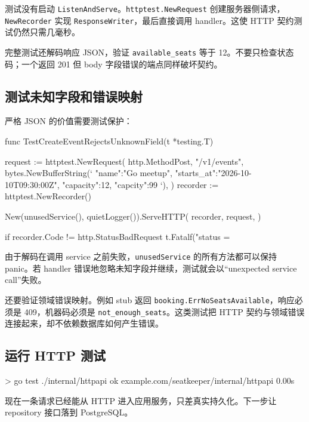 测试没有启动 \texttt{ListenAndServe}。\texttt{httptest.NewRequest} 创建服务器侧请求，\texttt{NewRecorder} 实现 \texttt{ResponseWriter}，最后直接调用 handler。这使 HTTP 契约测试仍然只需几毫秒。

完整测试还解码响应 JSON，验证 \texttt{available\_seats} 等于 12。不要只检查状态码；一个返回 201 但 body 字段错误的端点同样破坏契约。

\subsection{测试未知字段和错误映射}

严格 JSON 的价值需要测试保护：

\begin{gocode}[title={代码清单 12.35 拒绝未知 JSON 字段}]
func TestCreateEventRejectsUnknownField(t *testing.T) {
    request := httptest.NewRequest(
        http.MethodPost,
        "/v1/events",
        bytes.NewBufferString(`{
          "name":"Go meetup",
          "starts_at":"2026-10-10T09:30:00Z",
          "capacity":12,
          "capcity":99
        }`),
    )
    recorder := httptest.NewRecorder()

    New(unusedService(), quietLogger()).ServeHTTP(
        recorder, request,
    )

    if recorder.Code != http.StatusBadRequest {
        t.Fatalf("status = %
    }
}
\end{gocode}

由于解码在调用 service 之前失败，\texttt{unusedService} 的所有方法都可以保持 panic。若 handler 错误地忽略未知字段并继续，测试就会以“unexpected service call”失败。

还要验证领域错误映射。例如 stub 返回 \texttt{booking.ErrNoSeatsAvailable}，响应必须是 409，机器码必须是 \texttt{not\_enough\_seats}。这类测试把 HTTP 契约与领域错误连接起来，却不依赖数据库如何产生错误。

\subsection{运行 HTTP 测试}

\begin{shellcode}[title={运行 HTTP 适配器测试}]
> go test ./internal/httpapi
ok      example.com/seatkeeper/internal/httpapi   0.00s
\end{shellcode}
\color{PocketInk}

现在一条请求已经能从 HTTP 进入应用服务，只差真实持久化。下一步让 repository 接口落到 PostgreSQL。

